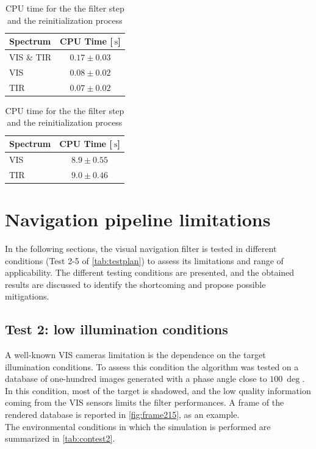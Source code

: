 \begin{table}[!h]
    \begin{subtable}[h]{0.42\textwidth}
        \centering
        \begin{tabular}{l  c }
        Spectrum & CPU Time [$\SI{}{\second}$]\\ \hline \hline
        VIS \& TIR &  $0.17\pm 0.03$\\\hline
        VIS &  $0.08\pm 0.02$ \\\hline
        TIR &  $0.07\pm 0.02$ \\\hline
        \end{tabular}
        \caption{Filter's step computational time}
        \label{tab:Csteps}
     \end{subtable}
    \hfill
    \begin{subtable}[h]{0.42\textwidth}
        \centering
        \begin{tabular}{l  c }
        Spectrum & CPU Time [$\SI{}{\second}$]\\ \hline \hline
        VIS &  $8.9\pm 0.55$ \\\hline
        TIR &  $9.0\pm 0.46$ \\\hline
        \end{tabular}
        \caption{re-initialization computational time}
        \label{tab:Creinit}
     \end{subtable}
     \caption{CPU time for the the filter step and the reinitialization process}
     \label{tab:Ctimes}
\end{table}
\section{Navigation pipeline limitations}
In the following sections, the visual navigation filter is tested in different conditions (Test 2-5 of \cref{tab:testplan}) to assess its limitations and range of applicability. The different testing conditions are presented, and the obtained results are discussed to identify the shortcoming and propose possible mitigations.

\subsection{Test 2: low illumination conditions}
A well-known VIS cameras limitation is the dependence on the target illumination conditions. To assess this condition the algorithm was tested on a database of one-hundred images generated with a phase angle close to $\SI{100}{\deg}$. In this condition, most of the target is shadowed, and the low quality information coming from the VIS sensors limits the filter performances. A frame of the rendered database is reported in \cref{fig:frame215}, as an example.\\
The environmental conditions in which the simulation is performed are summarized in \cref{tab:contest2}.\\

